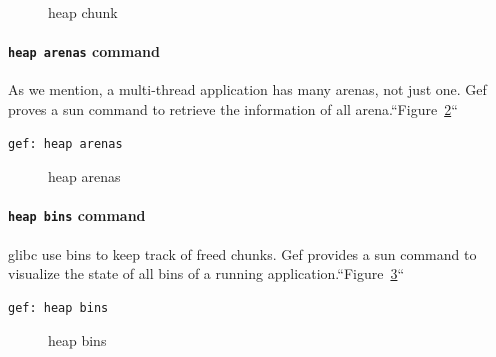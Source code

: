 \documentclass{masterthesis}
\newcommand*\libc{glibc}
\begin{document}
\begin{figure}[h!]
\caption{heap chunk}
\label{fig:gefheapchunk}
\end{figure}

\paragraph{\lstinline{heap arenas} command}
As we mention, a multi-thread application has many arenas, not just one. Gef proves a sun command to retrieve the information of all arena.``Figure~\ref{fig:gefheaparena}``

\begin{lstlisting}[frame=tlrb]
gef: heap arenas
\end{lstlisting}

\begin{figure}[h!]
\caption{heap arenas}
\label{fig:gefheaparena}
\end{figure}

\paragraph{\lstinline{heap bins} command}
\libc{} use bins to keep track of freed chunks. Gef provides a sun command to visualize the state of all bins of a running application.``Figure~\ref{fig:gefheapbins}``
\begin{lstlisting}[frame=tlrb]
gef: heap bins
\end{lstlisting}

\begin{figure}[h!]
\caption{heap bins}
\label{fig:gefheapbins}
\end{figure}
\end{document}
